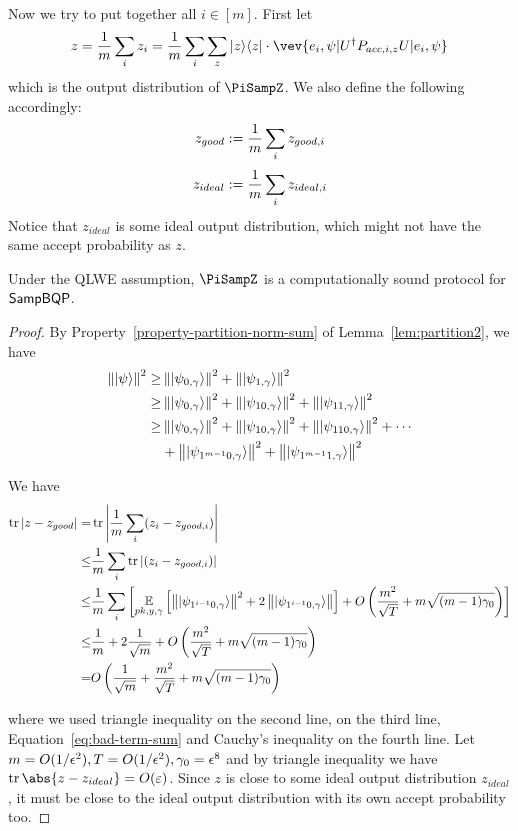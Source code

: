 Now we try to put together all $i\in [m]$. First let
$$z=\frac{1}{m} \sum_i z_i= \frac{1}{m} \sum_i \sum_z \proj{z} \cdot \vev{e_i,\psi|U^\dag P_{acc,i,z} U|e_i,\psi}$$
which is the output distribution of $\PiSampZ$.
We also define the following accordingly:
$$z_{good}:= \frac{1}{m}\sum_i z_{good,i}$$
$$z_{ideal}:= \frac{1}{m}\sum_i z_{ideal,i}$$
Notice that $z_{ideal}$ is some ideal output distribution, which might not have the same accept probability as $z$.

\begin{theorem}
	Under the QLWE assumption, $\PiSampZ$ is a computationally sound protocol for $\operatorname{\mathsf{SampBQP}}$.
\end{theorem}
\begin{proof}
	By Property~\ref{property-partition-norm-sum} of Lemma~\ref{lem:partition2}, we have
	\begin{align} \label{eq:bad-term-sum}
		\left\lVert\ket{\psi}\right\rVert^2 \geq& \left\lVert\ket{\psi_{0,\gamma}}\right\rVert^2+\left\lVert\ket{\psi_{1,\gamma}}\right\rVert^2 \nonumber \\
		\geq& \left\lVert\ket{\psi_{0,\gamma}}\right\rVert^2+
		\left\lVert\ket{\psi_{10,\gamma}}\right\rVert^2+ \left\lVert\ket{\psi_{11,\gamma}}\right\rVert^2 \nonumber \\
		\geq& \left\lVert\ket{\psi_{0,\gamma}}\right\rVert^2+
		\left\lVert\ket{\psi_{10,\gamma}}\right\rVert^2+ \left\lVert\ket{\psi_{110,\gamma}}\right\rVert^2 +\cdots  \nonumber \\
		&+ \left\lVert\ket{\psi_{1^{m-1}0,\gamma}}\right\rVert^2+ \left\lVert\ket{\psi_{1^{m-1}1,\gamma}}\right\rVert^2
	\end{align}

	We have
	\begin{align} \label{eq:z-z-good}
		\tr|z-z_{good}| =& \tr\L|\frac{1}{m}\sum_i (z_i-z_{good,i})\R| \nn \\
		\leq&  \frac{1}{m}\sum_i\tr| (z_i-z_{good,i})| \nn \\
		\leq&  \frac{1}{m}\sum_i\L[\E_{pk, y, \gamma}\L[\norm{\ket{\psi_{1^{i-1}0,\gamma}}}^2+ 2\norm{\ket{\psi_{1^{i-1}0,\gamma}}}\R]+O\L(\frac{m^2}{\sqrt T}+m\sqrt{(m-1)\gamma_0}\R)\R] \nn \\%
		\leq&  \frac{1}{m}+ 2\frac{1}{\sqrt m}+O\L(\frac{m^2}{\sqrt T}+m\sqrt{(m-1)\gamma_0}\R) \nn \\ %
		=&O\L( \frac{1}{\sqrt m}+\frac{m^2}{\sqrt T}+m\sqrt{(m-1)\gamma_0}\R)
	\end{align}

	where we used triangle inequality on the second line,  on the third line, Equation~\ref{eq:bad-term-sum} and Cauchy's inequality on the fourth line.
	Let $m=O(1/\epsilon^2), T=O(1/\epsilon^2),\gamma_0=\epsilon^8$ and by triangle inequality we have $\tr\abs{z-z_{ideal}}=O(\varepsilon)$.
	Since $z$ is close to some ideal output distribution $z_{ideal}$, it must be close to the ideal output distribution with its own accept probability too.
\end{proof}

